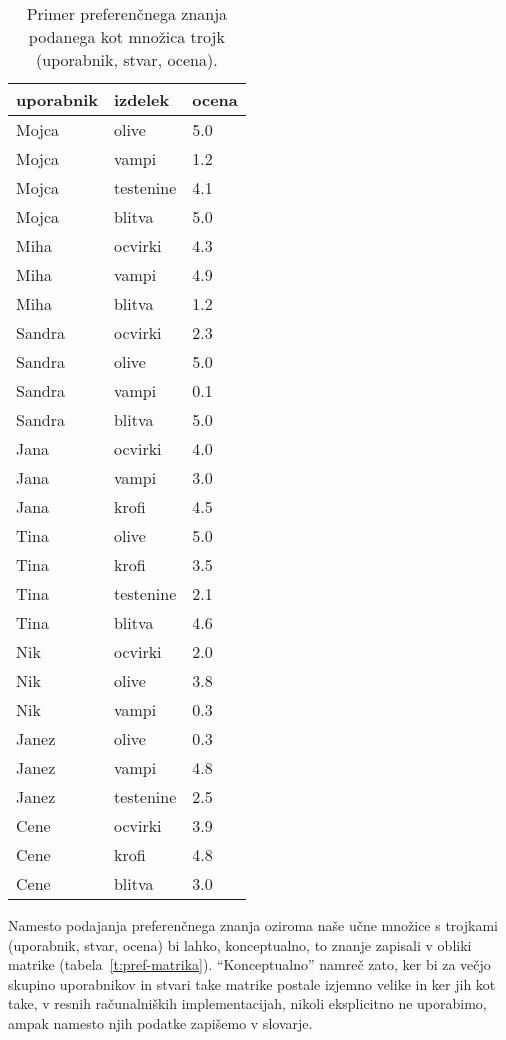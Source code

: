 \begin{table}
\caption{Primer preferenčnega znanja podanega kot množica trojk (uporabnik, stvar, ocena).}
\label{t:pref-ocene}
\begin{center}
\small
\begin{tabular}{lll}
\toprule
uporabnik & izdelek & ocena \\
\midrule
Mojca & olive & 5.0 \\
Mojca & vampi & 1.2 \\
Mojca & testenine & 4.1 \\
Mojca & blitva & 5.0 \\
Miha & ocvirki & 4.3 \\
Miha & vampi & 4.9 \\
Miha & blitva & 1.2 \\
Sandra & ocvirki & 2.3 \\
Sandra & olive & 5.0 \\
Sandra & vampi & 0.1 \\
Sandra & blitva & 5.0 \\
Jana & ocvirki & 4.0 \\
Jana & vampi & 3.0 \\
Jana & krofi & 4.5 \\
Tina & olive & 5.0 \\
Tina & krofi & 3.5 \\
Tina & testenine & 2.1 \\
Tina & blitva & 4.6 \\
Nik & ocvirki & 2.0 \\
Nik & olive & 3.8 \\
Nik & vampi & 0.3 \\
Janez & olive & 0.3 \\
Janez & vampi & 4.8 \\
Janez & testenine & 2.5 \\
Cene & ocvirki & 3.9 \\
Cene & krofi & 4.8 \\
Cene & blitva & 3.0 \\
\bottomrule
\end{tabular}
\end{center}
\end{table}

Namesto podajanja preferenčnega znanja oziroma naše učne množice s trojkami (uporabnik, stvar, ocena) bi lahko, konceptualno, to znanje zapisali v obliki matrike (tabela~\ref{t:pref-matrika}). ``Konceptualno'' namreč zato, ker bi za večjo skupino uporabnikov in stvari take matrike postale izjemno velike in ker jih kot take, v resnih računalniških implementacijah, nikoli eksplicitno ne uporabimo, ampak namesto njih podatke zapišemo v slovarje.

